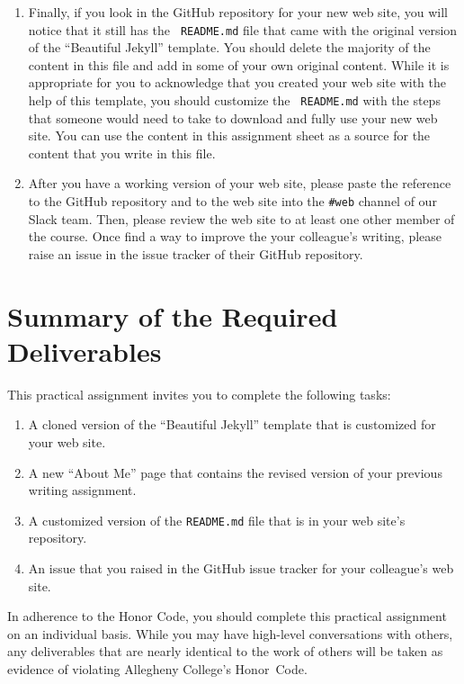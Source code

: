 \begin{enumerate}
  \item Finally, if you look in the GitHub repository for your new web site, you will notice that it still has the {\tt
    README.md} file that came with the original version of the ``Beautiful Jekyll'' template. You should delete the
    majority of the content in this file and add in some of your own original content. While it is appropriate for you
    to acknowledge that you created your web site with the help of this template, you should customize the {\tt
    README.md} with the steps that someone would need to take to download and fully use your new web site. You can use
    the content in this assignment sheet as a source for the content that you write in this file.

  \item After you have a working version of your web site, please paste the reference to the GitHub repository and to
    the web site into the {\tt \#web} channel of our Slack team. Then, please review the web site to at least one other
    member of the course. Once find a way to improve the your colleague's writing, please raise an issue in the issue
    tracker of their GitHub repository.

\end{enumerate}

\vspace*{-.175in}
\section*{Summary of the Required Deliverables}

This practical assignment invites you to complete the following tasks:

\vspace*{-.1in}
\begin{enumerate}
  \setlength{\itemsep}{0in}

  \item A cloned version of the ``Beautiful Jekyll'' template that is customized for your web site.
  \item A new ``About Me'' page that contains the revised version of your previous writing assignment.
  \item A customized version of the {\tt README.md} file that is in your web site's repository.
  \item An issue that you raised in the GitHub issue tracker for your colleague's web site.

\end{enumerate}
\vspace*{-.1in}

In adherence to the Honor Code, you should complete this practical assignment on an individual basis. While you may have
high-level conversations with others, any deliverables that are nearly identical to the work of others will be taken as
evidence of violating Allegheny College's \mbox{Honor Code}.


